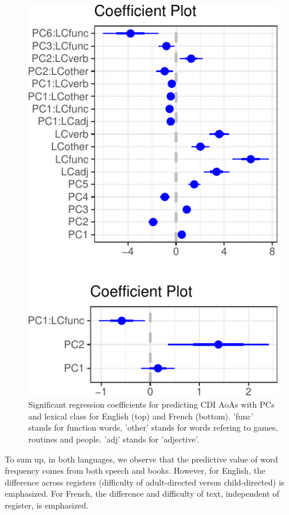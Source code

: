 \documentclass[10pt, letterpaper]{article}
\newenvironment{CodeChunk}{}{}
\begin{document}
\begin{CodeChunk}
\begin{figure}[H]

{\centering \includegraphics{figs/unnamed-chunk-8-1} 

}

\caption[Significant regression coefficients for predicting CDI AoAs with PCs and lexical class for English (top) and French (bottom)]{Significant regression coefficients for predicting CDI AoAs with PCs and lexical class for English (top) and French (bottom). 'func' stands for function words, 'other' stands for words refering to games, routines and people. 'adj' stands for 'adjective'. }\label{fig:unnamed-chunk-8}
\end{figure}
\end{CodeChunk}

To sum up, in both languages, we observe that the predictive value of
word frequency comes from both speech and books. However, for English,
the difference across registers (difficulty of adult-directed versus
child-directed) is emphasized. For French, the difference and difficulty
of text, independent of register, is emphasized.
\end{document}
